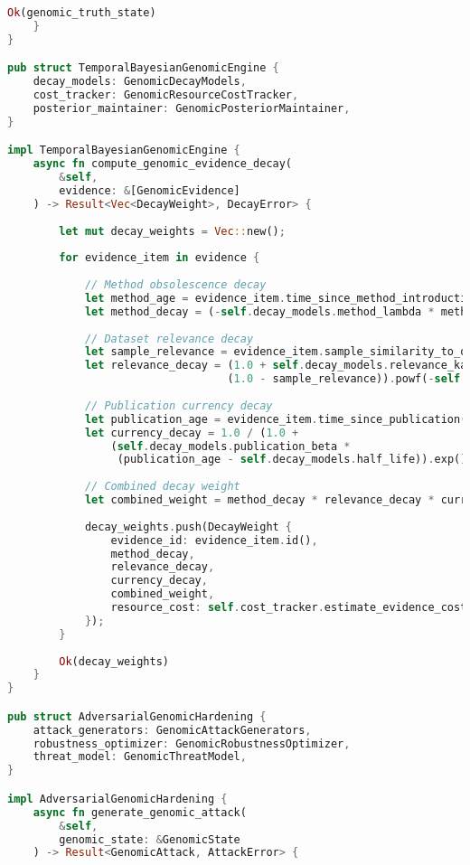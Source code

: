 \documentclass[12pt,a4paper]{article}
\begin{document}
\begin{lstlisting}[language=Rust, caption=Honjo Masamune Genomic Truth Engine Integration]
        Ok(genomic_truth_state)
    }
}

pub struct TemporalBayesianGenomicEngine {
    decay_models: GenomicDecayModels,
    cost_tracker: GenomicResourceCostTracker,
    posterior_maintainer: GenomicPosteriorMaintainer,
}

impl TemporalBayesianGenomicEngine {
    async fn compute_genomic_evidence_decay(
        &self,
        evidence: &[GenomicEvidence]
    ) -> Result<Vec<DecayWeight>, DecayError> {
        
        let mut decay_weights = Vec::new();
        
        for evidence_item in evidence {
            
            // Method obsolescence decay
            let method_age = evidence_item.time_since_method_introduction();
            let method_decay = (-self.decay_models.method_lambda * method_age).exp();
            
            // Dataset relevance decay
            let sample_relevance = evidence_item.sample_similarity_to_query();
            let relevance_decay = (1.0 + self.decay_models.relevance_kappa * 
                                  (1.0 - sample_relevance)).powf(-self.decay_models.relevance_alpha);
            
            // Publication currency decay
            let publication_age = evidence_item.time_since_publication();
            let currency_decay = 1.0 / (1.0 + 
                (self.decay_models.publication_beta * 
                 (publication_age - self.decay_models.half_life)).exp());
            
            // Combined decay weight
            let combined_weight = method_decay * relevance_decay * currency_decay;
            
            decay_weights.push(DecayWeight {
                evidence_id: evidence_item.id(),
                method_decay,
                relevance_decay,
                currency_decay,
                combined_weight,
                resource_cost: self.cost_tracker.estimate_evidence_cost(evidence_item)
            });
        }
        
        Ok(decay_weights)
    }
}

pub struct AdversarialGenomicHardening {
    attack_generators: GenomicAttackGenerators,
    robustness_optimizer: GenomicRobustnessOptimizer,
    threat_model: GenomicThreatModel,
}

impl AdversarialGenomicHardening {
    async fn generate_genomic_attack(
        &self,
        genomic_state: &GenomicState
    ) -> Result<GenomicAttack, AttackError> {
        

\end{lstlisting}
\end{document}
